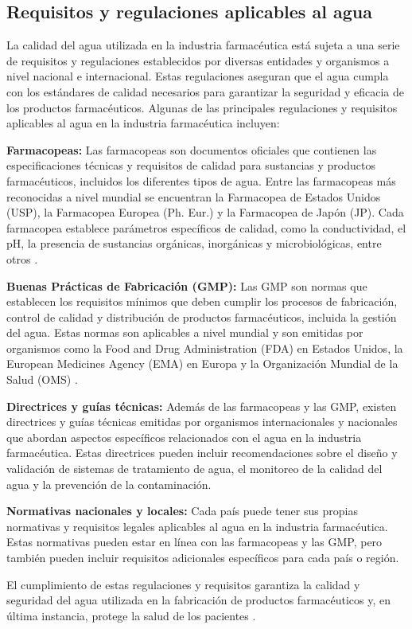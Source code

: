 \subsection{ Requisitos y regulaciones aplicables al agua}

La calidad del agua utilizada en la industria farmacéutica está sujeta a una serie de requisitos y regulaciones establecidos por diversas entidades y organismos a nivel nacional e internacional. Estas regulaciones aseguran que el agua cumpla con los estándares de calidad necesarios para garantizar la seguridad y eficacia de los productos farmacéuticos. Algunas de las principales regulaciones y requisitos aplicables al agua en la industria farmacéutica incluyen:

\textbf{Farmacopeas:} Las farmacopeas son documentos oficiales que contienen las especificaciones técnicas y
requisitos de calidad para sustancias y productos farmacéuticos, incluidos los diferentes
tipos de agua. Entre las farmacopeas más reconocidas a nivel mundial se encuentran la
Farmacopea de Estados Unidos (USP), la Farmacopea Europea (Ph. Eur.) y la Farmacopea de Japón
(JP). Cada farmacopea establece parámetros específicos de calidad, como la conductividad,
el pH, la presencia de sustancias orgánicas, inorgánicas y microbiológicas, entre otros \cite{farm.veronicamartinezFARMACOPEAS2005}.

\textbf{ Buenas Prácticas de Fabricación (GMP):} Las GMP son normas que establecen los requisitos mínimos que deben cumplir
los procesos de fabricación, control de calidad y distribución de productos farmacéuticos, incluida la gestión del agua.
Estas normas son aplicables a nivel mundial y son emitidas por organismos como la Food and Drug Administration (FDA) en
Estados Unidos, la European Medicines Agency (EMA) en Europa y la Organización Mundial de la Salud (OMS) \cite{ispeGoodManufacturingPractice}.

\textbf{ Directrices y guías técnicas:} Además de las farmacopeas y las GMP, existen directrices y guías técnicas
emitidas por organismos internacionales y nacionales que abordan aspectos específicos relacionados con el agua en
la industria farmacéutica. Estas directrices pueden incluir recomendaciones sobre el diseño y validación de sistemas
de tratamiento de agua, el monitoreo de la calidad del agua y la prevención de la contaminación.

\textbf{ Normativas nacionales y locales:} Cada país puede tener sus propias normativas y requisitos legales
aplicables al agua en la industria farmacéutica. Estas normativas pueden estar en línea con las farmacopeas y
las GMP, pero también pueden incluir requisitos adicionales específicos para cada país o región.


El cumplimiento de estas regulaciones y requisitos garantiza la calidad y seguridad del agua utilizada en la fabricación de productos farmacéuticos y, en última instancia, protege la salud de los pacientes \cite{juanantoniodelacuerdaImportanciaAguaIndustria2021}.
